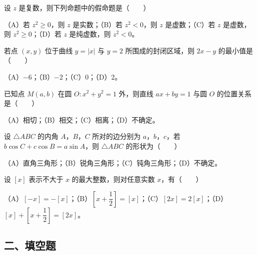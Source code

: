 \begin{question}
设 $z$ 是复数，则下列命题中的假命题是\mbox{（　　）}

（A）若 $z^2\geqslant0$，则 $z$ 是实数；（B）若 $z^2<0$，则 $z$ 是虚数；（C）若 $z$ 是虚数，则 $z^2\geqslant0$；（D）若 $z$ 是纯虚数，则 $z^2<0$。

\end{question}
\begin{question}
若点 $(x,y)$ 位于曲线 $y=|x|$ 与 $y=2$ 所围成的封闭区域，则 $2x-y$ 的最小值是\mbox{（　　）}

（A）$-6$；（B）$-2$；（C）$0$；（D）$2$。

\end{question}
\begin{question}
已知点 $M(a,b)$ 在圆 $O:x^2+y^2=1$ 外，则直线 $ax+by=1$ 与圆 $O$ 的位置关系是\mbox{（　　）}

（A）相切；（B）相交；（C）相离；（D）不确定。

\end{question}
\begin{question}
设 $\triangle ABC$ 的内角 $A$，$B$，$C$ 所对的边分别为 $a$，$b$，$c$，若 $b\cos C+c\cos B=a\sin A$，则 $\triangle ABC$ 的形状为\mbox{（　　）}

（A）直角三角形；（B）锐角三角形；（C）钝角三角形；（D）不确定。

\end{question}
\begin{question}
设 $[x]$ 表示不大于 $x$ 的最大整数，则对任意实数 $x$，有\mbox{（　　）}

（A）$[-x]=-[x]$；（B）$\left[x+\dfrac12\right]=[x]$；（C）$[2x]=2[x]$；（D）$[x]+\left[x+\dfrac12\right]=[2x]$。

\end{question}
\begingroup
\renewcommand{\gkpart}[1]{\Needspace{0.2\textheight}\subsection*{#1}\nopagebreak}
\gkpart{二、填空题}
\endgroup

